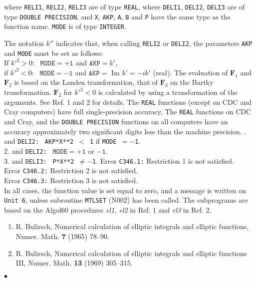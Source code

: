 where {\tt RELI1}, {\tt RELI2}, {\tt RELI3} are of type {\tt REAL},
where {\tt DELI1}, {\tt DELI2}, {\tt DELI3} are of type
{\tt DOUBLE PRECISION}, and {\tt X}, {\tt AKP}, {\tt A}, {\tt B} and
{\tt P} have the same type as the function name. {\tt MODE} is of type
{\tt INTEGER}.
\par
The notation $k''$ indicates that, when calling {\tt RELI2} or
{\tt DELI2}, the parameters {\tt AKP} and {\tt MODE} must be set
as follows: \\
If ${k'}^2 > 0$: \ $\mathtt{MODE = +1}$ and $\mathtt{AKP} = k'$, \\
if ${k'}^2 < 0$: \ $\mathtt{MODE = -1}$ and
$\mathtt{AKP} =$ Im $k' = -ik'$ (real).
\Method
The evaluation of $\mathbf{F}_1$ and $\mathbf{F}_2$ is based
on the Landen
transformation, that of $\mathbf{F}_3$ on the Bartky transformation.
$\mathbf{F}_2$ for ${k'}^2 < 0$ is calculated by using a transformation of
the arguments. See Ref. 1 and 2 for details.
\Accuracy
The {\tt REAL} functions (except on CDC and Cray computers) have full
single-precision accuracy. The {\tt REAL} functions on CDC and Cray, and
the {\tt DOUBLE PRECISION} functions on all computers have an accuracy
approximately two significant digits less than the machine precision.
.  and {\tt DELI2:} \
{\tt AKP*X**2 $<$ 1} if {\tt MODE $=-$1}.  \\
2. \quad {\tt RELI2} and {\tt DELI2:} \
$\mathtt{MODE = +1}$ or $\mathtt{-1}$. \\
3. \quad {\tt RELI3} and {\tt DELI3:} \ {\tt P*X**2 $\ne -$1}.
\Errorh
Error {\tt C346.1:} Restriction 1 is not satisfied. \\
Error {\tt C346.2:} Restriction 2 is not satisfied. \\
Error {\tt C346.3:} Restriction 3 is not satisfied. \\
In all cases, the function value
is set equal to zero, and a message is written on {\tt Unit 6},
unless subroutine {\tt MTLSET} (N002) has been called.
\newpage
\Source
The subprograms are based on the Algol60 procedures {\it el1, el2}
in Ref. 1 and {\it el3} in Ref. 2.
\Refer
\begin{enumerate}
\item R. Bulirsch, Numerical calculation of elliptic integrals and
elliptic functions, Numer. Math. {\bf 7} (1965) 78--90.
\item R. Bulirsch, Numerical calculation of elliptic integrals and
elliptic functions III, Numer. Math. {\bf 13} (1969) 305--315.
\end{enumerate}
$\bullet$
